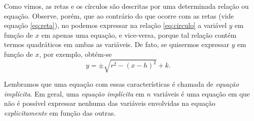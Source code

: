 Como vimos, as retas e os círculos são descritas por uma determinada relação ou equação. %
Observe, porém, que ao contrário do que ocorre com as retas (vide equação \eqref{eq:reta}), no podemos expressar na relação \eqref{eq:circulo} a variável $y$ em função de $x$ em apenas uma equação, e vice-versa, porque tal relação contém termos quadráticos em ambas as variáveis. De fato, se quisermos expressar $y$ em função de $x$, por exemplo, obtém-se
\[y=\pm \sqrt{r^2-(x-h)^2}+k.\]

Lembramos que uma equação com essas características é chamada de \textit{equação implícita}. Em geral, uma \textit{equação implícita} em $n$ variáveis é uma equação em que não é possível expressar nenhuma das variáveis envolvidas na equação \textit{explicitamente} em função das outras. %



